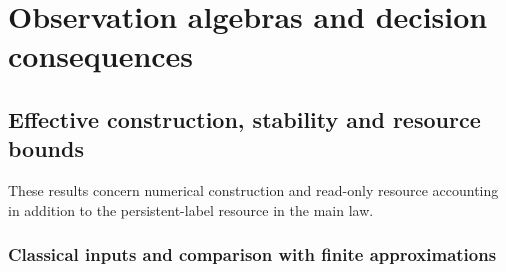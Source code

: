 \documentclass[11pt]{amsart}
\theoremstyle{definition}\newtheorem{definition}[theorem]{Definition}
\theoremstyle{remark}\newtheorem{remark}[theorem]{Remark}
\begin{document}
\section{Observation algebras and decision consequences}
\label{app:decisions}
\begingroup
\let\section\subsection
\let\subsection\subsubsection
\let\subsubsection\paragraph




\endgroup
\section{Effective construction, stability and resource bounds}
\label{app:effective}
These results concern numerical construction and read-only resource
accounting in addition to the persistent-label resource in the main law.
\begingroup
\let\section\subsection
\let\subsection\subsubsection
\let\subsubsection\paragraph





\endgroup
\section{Classical inputs and comparison with finite approximations}
\label{app:comparison}\label{sec:literature-comparison}




\end{document}
